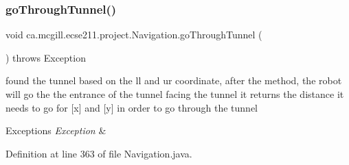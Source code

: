 \subsubsection{\texorpdfstring{go\+Through\+Tunnel()}{goThroughTunnel()}}
{\footnotesize\ttfamily void ca.\+mcgill.\+ecse211.\+project.\+Navigation.\+go\+Through\+Tunnel (\begin{DoxyParamCaption}{ }\end{DoxyParamCaption}) throws Exception}

found the tunnel based on the ll and ur coordinate, after the method, the robot will go the the entrance of the tunnel facing the tunnel it returns the distance it needs to go for \mbox{[}x\mbox{]} and \mbox{[}y\mbox{]} in order to go through the tunnel


\begin{DoxyExceptions}{Exceptions}
{\em Exception} & \\
\hline
\end{DoxyExceptions}


Definition at line 363 of file Navigation.\+java.


